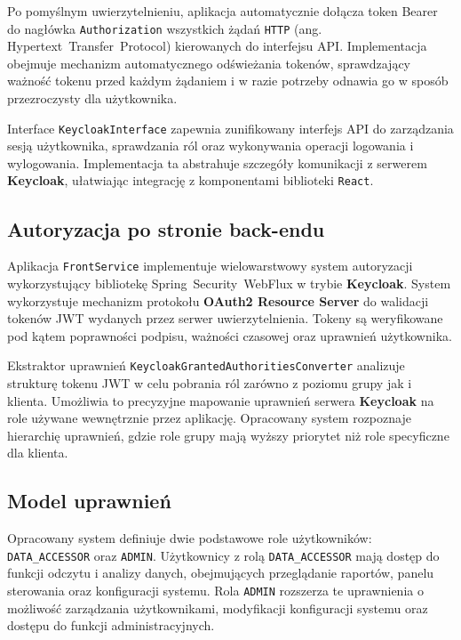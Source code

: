 Po pomyślnym uwierzytelnieniu, aplikacja automatycznie dołącza token Bearer do nagłówka \texttt{Authorization} wszystkich żądań \texttt{HTTP} (ang. \mbox{Hypertext Transfer Protocol}) kierowanych do interfejsu API. Implementacja obejmuje mechanizm automatycznego odświeżania tokenów, sprawdzający ważność tokenu przed każdym żądaniem i w razie potrzeby odnawia go w sposób przezroczysty dla użytkownika.

Interface \texttt{KeycloakInterface} zapewnia zunifikowany interfejs API do zarządzania sesją użytkownika, sprawdzania ról oraz wykonywania operacji logowania i wylogowania. Implementacja ta abstrahuje szczegóły komunikacji z serwerem \textbf{Keycloak}, ułatwiając integrację z komponentami biblioteki \texttt{React}.

\subsection{Autoryzacja po stronie back-endu}

Aplikacja \texttt{FrontService} implementuje wielowarstwowy system autoryzacji wykorzystujący bibliotekę \mbox{Spring Security WebFlux} w trybie \textbf{Keycloak}. System wykorzystuje mechanizm protokołu \textbf{OAuth2 Resource Server} do walidacji tokenów \mbox{JWT} wydanych przez serwer uwierzytelnienia. Tokeny są weryfikowane pod kątem poprawności podpisu, ważności czasowej oraz uprawnień użytkownika.

Ekstraktor uprawnień \texttt{KeycloakGrantedAuthoritiesConverter} analizuje strukturę tokenu \mbox{JWT} w celu pobrania ról zarówno z poziomu grupy jak i klienta. Umożliwia to precyzyjne mapowanie uprawnień serwera \textbf{Keycloak} na role używane wewnętrznie przez aplikację. Opracowany system rozpoznaje hierarchię uprawnień, gdzie role grupy mają wyższy priorytet niż role specyficzne dla klienta.

\subsection{Model uprawnień}

Opracowany system definiuje dwie podstawowe role użytkowników: \texttt{DATA\_ACCESSOR} oraz \texttt{ADMIN}. Użytkownicy z rolą \texttt{DATA\_ACCESSOR} mają dostęp do funkcji odczytu i analizy danych, obejmujących przeglądanie raportów, panelu sterowania oraz konfiguracji systemu. Rola \texttt{ADMIN} rozszerza te uprawnienia o możliwość zarządzania użytkownikami, modyfikacji konfiguracji systemu oraz dostępu do funkcji administracyjnych.

